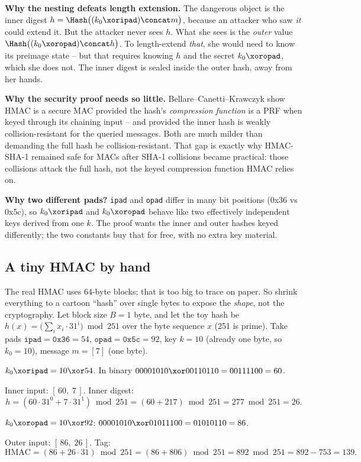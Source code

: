 \begin{whybox}
\textbf{Why the nesting defeats length extension.} The dangerous object is the inner digest $h = \Hash\big((k_0\xor\texttt{ipad})\concat m\big)$, because an attacker who saw \emph{it} could extend it. But the attacker never sees $h$. What she sees is the \emph{outer} value $\Hash\big((k_0\xor\texttt{opad})\concat h\big)$. To length-extend \emph{that}, she would need to know its preimage state -- but that requires knowing $h$ and the secret $k_0\xor\texttt{opad}$, which she does not. The inner digest is sealed inside the outer hash, away from her hands.

\textbf{Why the security proof needs so little.} Bellare--Canetti--Krawczyk show HMAC is a secure MAC provided the hash's \emph{compression function} is a PRF when keyed through its chaining input -- and provided the inner hash is weakly collision-resistant for the queried messages. Both are much milder than demanding the full hash be collision-resistant. That gap is exactly why HMAC-SHA-1 remained safe for MACs after SHA-1 collisions became practical: those collisions attack the full hash, not the keyed compression function HMAC relies on.

\textbf{Why two different pads?} \texttt{ipad} and \texttt{opad} differ in many bit positions (0x36 vs 0x5c), so $k_0\xor\texttt{ipad}$ and $k_0\xor\texttt{opad}$ behave like two effectively independent keys derived from one $k$. The proof wants the inner and outer hashes keyed differently; the two constants buy that for free, with no extra key material.
\end{whybox}

\subsection{A tiny HMAC by hand}
\label{ch15:hmac-toy}

The real HMAC uses 64-byte blocks; that is too big to trace on paper. So shrink everything to a cartoon ``hash'' over single bytes to expose the \emph{shape}, not the cryptography. Let block size $B=1$ byte, and let the toy hash be $h(x) = \big(\sum_i x_i \cdot 31^{i} \big) \bmod 251$ over the byte sequence $x$ (251 is prime). Take pads $\texttt{ipad}=\texttt{0x36}=54$, $\texttt{opad}=\texttt{0x5c}=92$, key $k = 10$ (already one byte, so $k_0=10$), message $m = [7]$ (one byte).

\begin{walkbox}
$k_0\xor\texttt{ipad} = 10\xor 54$. In binary $00001010\xor 00110110 = 00111100 = 60$.

Inner input: $[\,60,\;7\,]$. Inner digest:
\[
 h = (60\cdot 31^{0} + 7\cdot 31^{1})\bmod 251 = (60 + 217)\bmod 251 = 277\bmod 251 = 26.
\]

$k_0\xor\texttt{opad} = 10\xor 92$: $00001010\xor 01011100 = 01010110 = 86$.

Outer input: $[\,86,\;26\,]$. Tag:
\[
 \mathrm{HMAC} = (86 + 26\cdot 31)\bmod 251 = (86 + 806)\bmod 251 = 892 \bmod 251 = 892 - 753 = 139.
\]
\end{walkbox}

